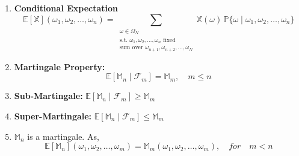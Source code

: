 \begin{enumerate}
    \begin{proof}
        $$\mathbb{P}\{\mathbb{M}_n = k \mid \mathbb{M}_{n-1} = a_{n-1}, \dots, \mathbb{M}_1 = a_1 \} = \frac{\mathbb{P}\{\mathbb{M}_n = k, \mathbb{M}_{n-1} = a_{n-1}, \dots, \mathbb{M}_1 = a_1 \}}{\mathbb{P}\{\mathbb{M}_{n-1} = a_{n-1}, \dots, \mathbb{M}_1 = a_1 \}}$$
        This evaluates to $\frac{\frac{1}{2^n}}{\frac{1}{2^{n-1}}} = \frac{1}{2}$, but the following quantity also evaluates to the same. Thus, $$\mathbb{P}\{\mathbb{M}_n = k \mid \mathbb{M}_{n-1} = a_{n-1}, \dots, \mathbb{M}_1 = a_1 \}  = \mathbb{P} \{\mathbb{M}_n = k \mid \mathbb{M}_{n-1} = a_{n-1}\}$$
    \end{proof}
    \item \textbf{Conditional Expectation}
    $$
    \mathbb{E}[\mathbb{X}](\omega_1, \omega_2, \dots, \omega_n) 
    = \sum_{\substack{
        \omega \in \Omega_N \\[4pt]
        \text{s.t. } \omega_1, \omega_2, \dots, \omega_n \text{ fixed} \\[4pt]
        \text{sum over } \omega_{n+1}, \omega_{n+2}, \dots, \omega_N
    }}
    \mathbb{X}(\omega)\, \mathbb{P}\{\omega \mid \omega_1, \omega_2, \dots, \omega_n\}
    $$
    \item \textbf{Martingale Property:} $$\mathbb{E} [\mathbb{M}_n \mid \mathcal{F}_m] = \mathbb{M}_m, \quad m \leq n$$
    \item \textbf{Sub-Martingale:} $\mathbb{E} [\mathbb{M}_n \mid \mathcal{F}_m] \geq \mathbb{M}_m$
    \item \textbf{Super-Martingale:} $\mathbb{E} [\mathbb{M}_n \mid \mathcal{F}_m] \leq \mathbb{M}_m$
    \item $\mathbb{M}_n$ is a martingale. As, $$\mathbb{E} [\mathbb{M}_n] (\omega_1, \omega_2, \dots, \omega_m) = \mathbb{M}_m(\omega_1, \omega_2, \dots, \omega_m), \quad for \quad m < n$$

\end{enumerate}




